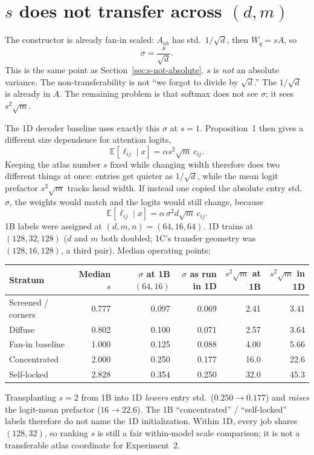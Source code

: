 \documentclass[11pt,a4paper]{report}
\begin{document}
\section{\texorpdfstring{$s$ does not transfer across $(d,m)$}{s does not transfer across (d, m)}}
\label{sec:s-transfer}

The constructor is already fan-in scaled: $A_{ab}$ has std.\ $1/\sqrt{d}$, then $W_q=sA$, so
\[
\sigma = \frac{s}{\sqrt{d}}.
\]
This is the same point as Section~\ref{sec:s-not-absolute}. $s$ is \emph{not} an absolute variance. The non-transferability is not ``we forgot to divide by $\sqrt{d}$.'' The $1/\sqrt{d}$ is already in $A$. The remaining problem is that softmax does not see $\sigma$; it sees $s^2\sqrt{m}$.

The 1D decoder baseline uses exactly this $\sigma$ at $s=1$. Proposition~1 then gives a different size dependence for attention logits,
\[
\mathbb{E}[\ell_{ij}\mid x]=\alpha s^2\sqrt{m}\,c_{ij}.
\]
Keeping the atlas number $s$ fixed while changing width therefore does two different things at once: entries get quieter as $1/\sqrt{d}$, while the mean logit prefactor $s^2\sqrt{m}$ tracks head width. If instead one copied the absolute entry std.\ $\sigma$, the weights would match and the logits would still change, because
\[
\mathbb{E}[\ell_{ij}\mid x]=\alpha\,\sigma^2 d\sqrt{m}\,c_{ij}.
\]
1B labels were assigned at $(d,m,n)=(64,16,64)$. 1D trains at $(128,32,128)$ ($d$ and $m$ both doubled; 1C's transfer geometry was $(128,16,128)$, a third pair). Median operating points:

\begin{center}
{\small
\begin{tabular}{lrrrrr}
\toprule
Stratum & Median $s$ & $\sigma$ at 1B $(64,16)$ & $\sigma$ as run in 1D & $s^2\sqrt{m}$ at 1B & $s^2\sqrt{m}$ in 1D \\
\midrule
Screened / corners & 0.777 & 0.097 & 0.069 & 2.41 & 3.41 \\
Diffuse & 0.802 & 0.100 & 0.071 & 2.57 & 3.64 \\
Fan-in baseline & 1.000 & 0.125 & 0.088 & 4.00 & 5.66 \\
Concentrated & 2.000 & 0.250 & 0.177 & 16.0 & 22.6 \\
Self-locked & 2.828 & 0.354 & 0.250 & 32.0 & 45.3 \\
\bottomrule
\end{tabular}}
\end{center}

Transplanting $s=2$ from 1B into 1D \emph{lowers} entry std.\ ($0.250\to 0.177$) and \emph{raises} the logit-mean prefactor ($16\to 22.6$). The 1B ``concentrated'' / ``self-locked'' labels therefore do not name the 1D initialization. Within 1D, every job shares $(128,32)$, so ranking $s$ is still a fair within-model scale comparison; it is not a transferable atlas coordinate for Experiment~2.
\end{document}
